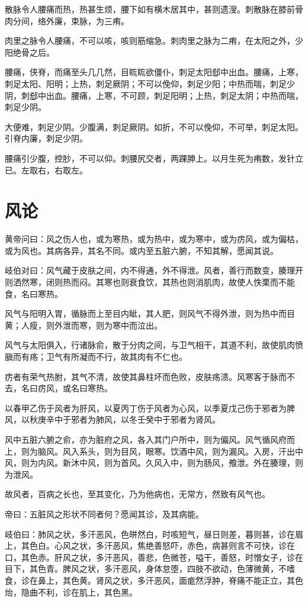 \documentclass{article}%
\begin{document}
散脉令人腰痛而热，热甚生烦，腰下如有横木居其中，甚则遗溲。刺散脉在膝前骨肉分间，络外廉，束脉，为三痏。

肉里之脉令人腰痛，不可以咳，咳则筋缩急。刺肉里之脉为二痏，在太阳之外，少阳绝骨之后。

腰痛，侠脊，而痛至头几几然，目䀮䀮欲僵仆，刺足太阳郄中出血。腰痛，上寒，刺足太阳、阳明；上热，刺足厥阴；不可以俛仰，刺足少阳；中热而喘，刺足少阴，刺郄中出血。腰痛，上寒，不可顾，刺足阳明；上热，刺足太阴；中热而喘，刺足少阴。

大便难，刺足少阴。少腹满，刺足厥阴。如折，不可以俛仰，不可举，刺足太阳。引脊内廉，刺足少阴。

腰痛引少腹，控䏚，不可以仰。刺腰尻交者，两踝胂上。以月生死为痏数，发针立已。左取右，右取左。
\section{风论}
黄帝问曰：风之伤人也，或为寒热，或为热中，或为寒中，或为疠风，或为偏枯，或为风也。其病各异，其名不同。或内至五脏六腑，不知其解，愿闻其说。

岐伯对曰：风气藏于皮肤之间，内不得通，外不得泄。风者，善行而数变，腠理开则洒然寒，闭则热而闷。其寒也则衰食饮，其热也则消肌肉，故使人怢栗而不能食，名曰寒热。

风气与阳明入胃，循脉而上至目内眦，其人肥，则风气不得外泄，则为热中而目黄；人瘦，则外泄而寒，则为寒中而泣出。

风气与太阳俱入，行诸脉俞，散于分肉之间，与卫气相干，其道不利，故使肌肉愤䐜而有疡；卫气有所凝而不行，故其肉有不仁也。

疠者有荣气热胕，其气不清，故使其鼻柱坏而色败，皮肤疡溃。风寒客于脉而不去，名曰疠风，或名曰寒热。

以春甲乙伤于风者为肝风，以夏丙丁伤于风者为心风，以季夏戊己伤于邪者为脾风，以秋庚辛中于邪者为肺风，以冬壬癸中于邪者为肾风。

风中五脏六腑之俞，亦为脏府之风，各入其门户所中，则为偏风。风气循风府而上，则为脑风。风入系头，则为目风，眼寒。饮酒中风，则为漏风。入房，汗出中风，则为内风。新沐中风，则为首风。久风入中，则为肠风，飧泄。外在腠理，则为泄风。

故风者，百病之长也，至其变化，乃为他病也，无常方，然致有风气也。

帝曰：五脏风之形状不同者何？愿闻其诊，及其病能。

岐伯曰：肺风之状，多汗恶风，色皏然白，时咳短气，昼日则差，暮则甚，诊在眉上，其色白。心风之状，多汗恶风，焦绝善怒吓，赤色，病甚则言不可快，诊在口，其色赤。肝风之状，多汗恶风，善悲，色微苍，嗌干，善怒，时憎女子，诊在目下，其色青。脾风之状，多汗恶风，身体怠堕，四肢不欲动，色薄微黄，不嗜食，诊在鼻上，其色黄。肾风之状，多汗恶风，面痝然浮肿，脊痛不能正立，其色炲，隐曲不利，诊在肌上，其色黑。
\end{document}
